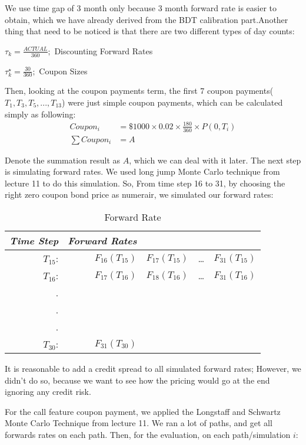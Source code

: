 \documentclass[paper = letterpaper, fontsize=12pt]{article}
\begin{document}
We use time gap of 3 month only because 3 month forward rate is easier to obtain, which we have already derived from the BDT calibration part.Another thing that need to be noticed is that there are two different types of day counts:

\quad$\tau_k = \frac{ACTUAL}{360};$ Discounting Forward Rates

\quad$\tau_k^\star = \frac{30}{360};$ Coupon Sizes

Then, looking at the coupon payments term, the first 7 coupon payments($T_1, T_3, T_5, ..., T_13$) were just simple coupon payments, which can be calculated simply as following:
\begin{align}
	Coupon_i &= \$1000 \times 0.02 \times \frac{180}{360} \times P(0, T_i)\\
	\sum Coupon_i &= A
\end{align}

Denote the summation result as $A$, which we can deal with it later. The next step is simulating forward rates. We used long jump Monte Carlo technique from lecture 11 to do this simulation. So, From time step 16 to 31, by choosing the right zero coupon bond price as numerair, we simulated our forward rates:
\begin{table}[htbp]
  \centering
    \begin{tabular}{rrrrr}
    \toprule
    \emph{Time Step} & \emph{Forward Rates}\\
    \midrule
    $T_{15}$: & $F_{16}(T_{15})$ & $F_{17}(T_{15})$ & …     & $F_{31}(T_{15})$ \\
    $T_{16}$: & $F_{17}(T_{16})$ & $F_{18}(T_{16})$ & …     & $F_{31}(T_{16})$ \\
    .     &       &       &       &  \\
    .     &       &       &       &  \\
    .     &       &       &       &  \\
    $T_{30}$: & $F_{31}(T_{30})$ &       &       &  \\
    \bottomrule
    \end{tabular}%
  \label{tab:addlabel}%
\caption{Forward Rate}
\end{table}%

It is reasonable to add a credit spread to all simulated forward rates; However, we didn't do so, 
because we want to see how the pricing would go at the end ignoring any credit risk.

For the call feature coupon payment, we applied the Longstaff and Schwartz Monte Carlo Technique from lecture 11. We ran a lot of paths, and get all forwards rates on each path. Then, for the evaluation, on each path/simulation $i$:
\end{document}
